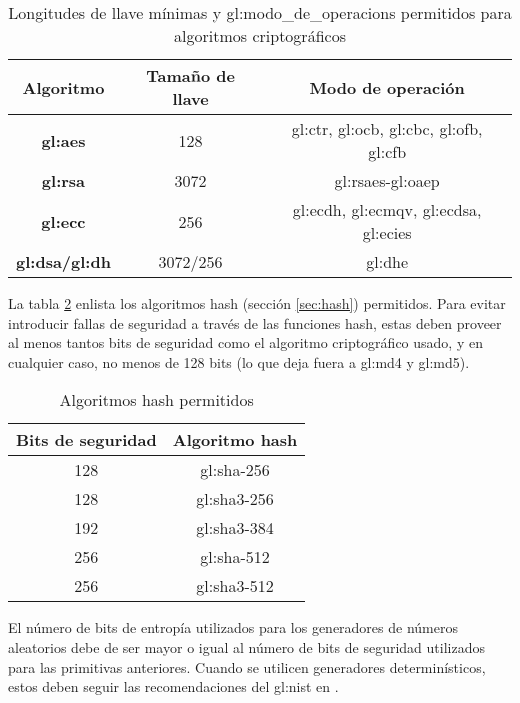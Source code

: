\begin{table}[H]
  \centering
  \begin{tabular}{| c | c | c |}
    \hline
    \textbf{Algoritmo} &
    \textbf{Tamaño de llave} &
    \textbf{Modo de operación} \\ [0.5ex]
    \hline
    \textbf{\gls{gl:aes}} &
    128 &
    \acrshort{gl:ctr},
    \acrshort{gl:ocb},
    \acrshort{gl:cbc},
    \acrshort{gl:ofb},
    \acrshort{gl:cfb} \\
    \hline
    \textbf{\gls{gl:rsa}} &
    3072 &
    \acrshort{gl:rsaes}-\acrshort{gl:oaep} \\
    \hline
    \textbf{\gls{gl:ecc}} &
    256 &
    \acrshort{gl:ecdh},
    \acrshort{gl:ecmqv},
    \acrshort{gl:ecdsa},
    \acrshort{gl:ecies} \\
    \hline
    \textbf{\gls{gl:dsa}/\gls{gl:dh}} &
    3072/256 &
    \acrshort{gl:dhe}\\
    \hline
  \end{tabular}
  \caption{Longitudes de llave mínimas y \glspl{gl:modo_de_operacion}
      permitidos para algoritmos criptográficos}
  \label{minimo_llaves}
\end{table}

La tabla \ref{hash_permitidos} enlista los algoritmos hash (sección
\ref{sec:hash}) permitidos. Para evitar introducir fallas de seguridad a
través de las funciones hash, estas deben proveer al menos tantos bits de
seguridad como el algoritmo criptográfico usado, y en cualquier caso, no
menos de 128 bits (lo que deja fuera a \gls{gl:md4} y \gls{gl:md5}).

\begin{table}[H]
  \centering
  \begin{tabular}{| c | c |}
    \hline
    \textbf{Bits de seguridad} &
    \textbf{Algoritmo hash} \\ [0.5ex]
    \hline
    128 & \gls{gl:sha}-256 \\
    \hline
    128 & \gls{gl:sha}3-256 \\
    \hline
    192 & \gls{gl:sha}3-384 \\
    \hline
    256 & \gls{gl:sha}-512 \\
    \hline
    256 & \gls{gl:sha}3-512 \\
    \hline
  \end{tabular}
  \caption{Algoritmos hash permitidos}
  \label{hash_permitidos}
\end{table}


El número de bits de entropía utilizados para los generadores de números
aleatorios debe de ser mayor o igual al número de bits de seguridad utilizados
para las primitivas anteriores. Cuando se utilicen generadores determinísticos,
estos deben seguir las recomendaciones del \gls{gl:nist} en
\cite{nist_aleatorios}.
